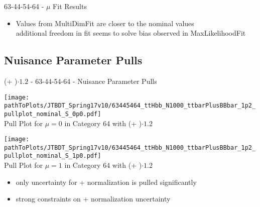 \begin{frame}{63-44-54-64 - $\mu$ Fit Results}
\begin{scriptsize}


\end{scriptsize}
\begin{itemize}
\item Values from MultiDimFit are closer to the nominal values\\
\rar additional freedom in fit seems to solve bias observed in MaxLikelihoodFit
\end{itemize}
\end{frame}

\subsection{Nuisance Parameter Pulls}
\begin{frame}{(\ttbar + \bbbar)$\cdot \num[round-precision=1]{1.2}$ - 63-44-54-64 - Nuisance Parameter Pulls}
\vskip -0.3cm


\begin{minipage}{0.4\textwidth}
\begin{center}
\texttt{[image: \\pathToPlots/JTBDT\_Spring17v10/63445464\_ttHbb\_N1000\_ttbarPlusBBbar\_1p2\_pullplot\_nominal\_S\_0p0.pdf]}\\
Pull Plot for $\mu = 0$ in Category 64 with (\ttbar + \bbbar)$\cdot \num[round-precision=1]{1.2}$
\end{center}

\end{minipage}
\hfill
\begin{minipage}{0.4\textwidth}
\begin{center}
\texttt{[image: \\pathToPlots/JTBDT\_Spring17v10/63445464\_ttHbb\_N1000\_ttbarPlusBBbar\_1p2\_pullplot\_nominal\_S\_1p0.pdf]}\\
Pull Plot for $\mu = 1$ in Category 64 with (\ttbar + \bbbar)$\cdot \num[round-precision=1]{1.2}$
\end{center}


\end{minipage}



\begin{itemize}
\item only uncertainty for \ttbar + \bbbar normalization is pulled significantly\\
\item strong constraints on \ttbar + \bbbar normalization uncertainty
\end{itemize}


\end{frame}

